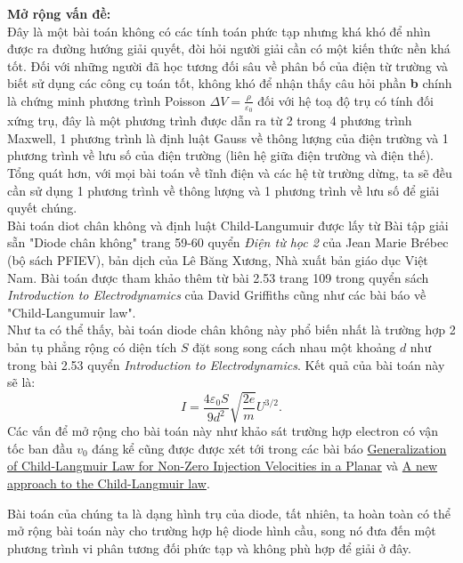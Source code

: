 \noindent \textbf{Mở rộng vấn đề:} \\
Đây là một bài toán không có các tính toán phức tạp nhưng khá khó để nhìn được ra đường hướng giải quyết, đòi hỏi người giải cần có một kiến thức nền khá tốt. Đối với những người đã học tương đối sâu về phân bố của điện từ trường và biết sử dụng các công cụ toán tốt, không khó để nhận thấy câu hỏi phần \textbf{b} chính là chứng minh phương trình Poisson $\Delta V = \frac{\rho}{\varepsilon_0}$ đối với hệ toạ độ trụ có tính đối xứng trụ, đây là một phương trình được dẫn ra từ 2 trong 4 phương trình Maxwell, 1 phương trình là định luật Gauss về thông lượng của điện trường và 1 phương trình về lưu số của điện trường (liên hệ giữa điện trường và điện thế). Tổng quát hơn, với mọi bài toán về tĩnh điện và các hệ từ trường dừng, ta sẽ đều cần sử dụng 1 phương trình về thông lượng và 1 phương trình về lưu số để giải quyết chúng. \\
Bài toán diot chân không và định luật Child-Langumuir được lấy từ Bài tập giải sẵn "Diode chân không" trang 59-60 quyển \textit{Điện từ học 2} của Jean Marie Brébec (bộ sách PFIEV), bản dịch của Lê Băng Xương, Nhà xuất bản giáo dục Việt Nam. Bài toán được tham khảo thêm từ bài 2.53 trang 109 trong quyển sách \textit{Introduction to Electrodynamics} của David Griffiths cũng như các bài báo về "Child-Langumuir law". \\
Như ta có thể thấy, bài toán diode chân không này phổ biến nhất là trường hợp 2 bản tụ phẳng rộng có diện tích $S$ đặt song song cách nhau một khoảng $d$ như trong bài 2.53 quyển \textit{Introduction to Electrodynamics}. Kết quả của bài toán này sẽ là:
$$ I = \frac{4 \varepsilon_0 S}{9d^2} \sqrt{ \frac{2e}{m}} U^{3/2}.$$
Các vấn để mở rộng cho bài toán này như khảo sát trường hợp electron có vận tốc ban đầu $v_0$ đáng kể cũng được được xét tới trong các bài báo \href{https://arxiv.org/abs/physics/0411175v1}{Generalization of Child-Langmuir Law for Non-Zero Injection Velocities in a Planar} và \href{http://de.arxiv.org/abs/1506.07417v1}{A new approach to the Child-Langmuir law}. 

Bài toán của chúng ta là dạng hình trụ của diode, tất nhiên, ta hoàn toàn có thể mở rộng bài toán này cho trường hợp hệ diode hình cầu, song nó đưa đến một phương trình vi phân tương đối phức tạp và không phù hợp để giải ở đây.